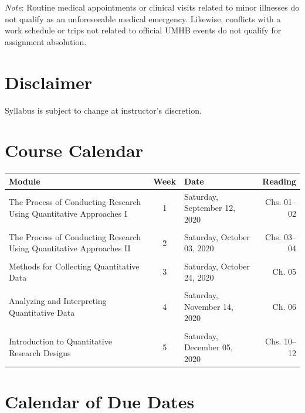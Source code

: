\documentclass[
]{article}
\begin{document}
\emph{Note}: Routine medical appointments or clinical visits related to
minor illnesses do not qualify as an unforeseeable medical emergency.
Likewise, conflicts with a work schedule or trips not related to
official UMHB events do not qualify for assignment absolution.

\section{Disclaimer}

Syllabus is subject to change at instructor's discretion.

\newpage

\section{Course Calendar}

\begin{tabularx}{\linewidth}{XcXr}
\hline
\textbf{Module} & \textbf{Week} & \textbf{Date} & \textbf{Reading} \\
\hline

The Process of Conducting Research Using Quantitative Approaches I & 1 & Saturday, September 12, 2020 & Chs. 01--02 \\
 &  &  &  \\
 
The Process of Conducting Research Using Quantitative Approaches II & 2 & Saturday, October 03, 2020 & Chs. 03--04 \\
 &  &  & \\
 
Methods for Collecting Quantitative Data & 3 & Saturday, October 24, 2020 & Ch. 05 \\
 &  &  & \\
 
Analyzing and Interpreting Quantitative Data & 4 & Saturday, November 14, 2020 & Ch. 06 \\
 &  &  &  \\
 
Introduction to Quantitative Research Designs & 5 & Saturday, December 05, 2020 & Chs. 10--12 \\
\hline
\end{tabularx}

\newpage
\section{Calendar of Due Dates}
\end{document}
